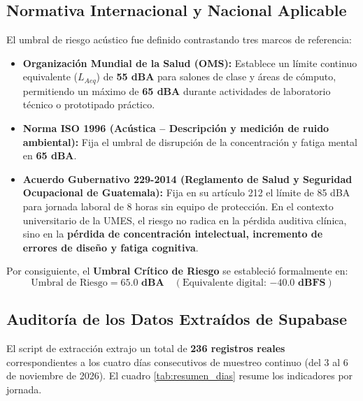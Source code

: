 \documentclass{article}
\begin{document}
\subsection{Normativa Internacional y Nacional Aplicable}
El umbral de riesgo acústico fue definido contrastando tres marcos de referencia:
\begin{itemize}
    \item \textbf{Organización Mundial de la Salud (OMS):} Establece un límite continuo equivalente ($L_{Aeq}$) de \textbf{55 dBA} para salones de clase y áreas de cómputo, permitiendo un máximo de \textbf{65 dBA} durante actividades de laboratorio técnico o prototipado práctico.
    \item \textbf{Norma ISO 1996 (Acústica -- Descripción y medición de ruido ambiental):} Fija el umbral de disrupción de la concentración y fatiga mental en \textbf{65 dBA}.
    \item \textbf{Acuerdo Gubernativo 229-2014 (Reglamento de Salud y Seguridad Ocupacional de Guatemala):} Fija en su artículo 212 el límite de 85 dBA para jornada laboral de 8 horas sin equipo de protección. En el contexto universitario de la UMES, el riesgo no radica en la pérdida auditiva clínica, sino en la \textbf{pérdida de concentración intelectual, incremento de errores de diseño y fatiga cognitiva}.
\end{itemize}

Por consiguiente, el \textbf{Umbral Crítico de Riesgo} se estableció formalmente en:
\begin{equation}
    \text{Umbral de Riesgo} = \mathbf{65.0\text{ dBA}} \quad (\text{Equivalente digital: } \mathbf{-40.0\text{ dBFS}})
\end{equation}

\subsection{Auditoría de los Datos Extraídos de Supabase}
El script de extracción extrajo un total de \textbf{236 registros reales} correspondientes a los cuatro días consecutivos de muestreo continuo (del 3 al 6 de noviembre de 2026). El cuadro \ref{tab:resumen_dias} resume los indicadores por jornada.
\end{document}
